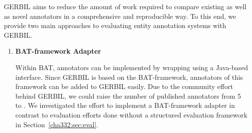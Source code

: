 GERBIL aims to reduce the amount of work required to compare existing as well as novel annotators in a comprehensive and reproducible way. To this end, we provide two main approaches to evaluating entity annotation systems with GERBIL.
\begin{enumerate}
\item \textbf{BAT-framework Adapter}

Within BAT, annotators can be implemented by wrapping using a Java-based interface.
Since GERBIL is based on the BAT-framework, annotators of this framework can be added to GERBIL easily.
Due to the community effort behind GERBIL, we could raise the number of published annotators from 5 to \overallGERBILannotators.
We investigated the effort to implement a BAT-framework adapter in contrast to evaluation efforts done without a structured evaluation framework in Section~\ref{cha332:sec:eval}.


\end{enumerate}
